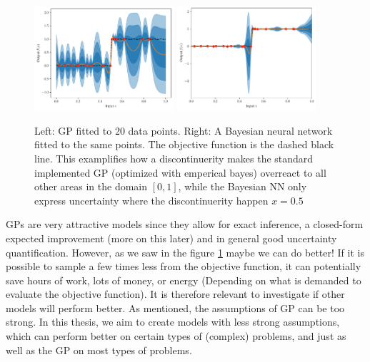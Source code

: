 \begin{figure}[H]%
    \centering
    {\includegraphics[width=0.46\textwidth]{Pictures/GP_vs_BNN1.pdf} }%
    \qquad
   {\includegraphics[width=0.46\textwidth]{Pictures/GP_vs_BNN2.pdf} }%
    \caption{Left: GP fitted to 20 data points. Right: A Bayesian neural network fitted to the same points.
    The objective function is the dashed black line. This examplifies how a discontinuerity makes the 
    standard implemented GP (optimized with emperical bayes) overreact to all other areas in the domain $[0,1]$,
    while the Bayesian NN only express uncertainty where the discontinuerity happen $x = 0.5$}%
    \label{fig:GP_vs_BNN}
\end{figure}



GPs are very attractive models since they allow for exact inference, a closed-form expected improvement (more on this later)
 and in general good uncertainty quantification.
However, as we saw in the figure \ref{fig:GP_vs_BNN} maybe we can do better! 
If it is possible to sample a few times less from the objective function, it can potentially
save hours of work, lots of money, or energy (Depending on what is demanded to evaluate the objective
function). It is therefore relevant to investigate if other models will perform better. As
mentioned, the assumptions of GP can be too strong. In this thesis, we aim to create models with less strong
assumptions, which can perform better on certain types of (complex) problems, and just as well as the GP on most types of  
problems. 

